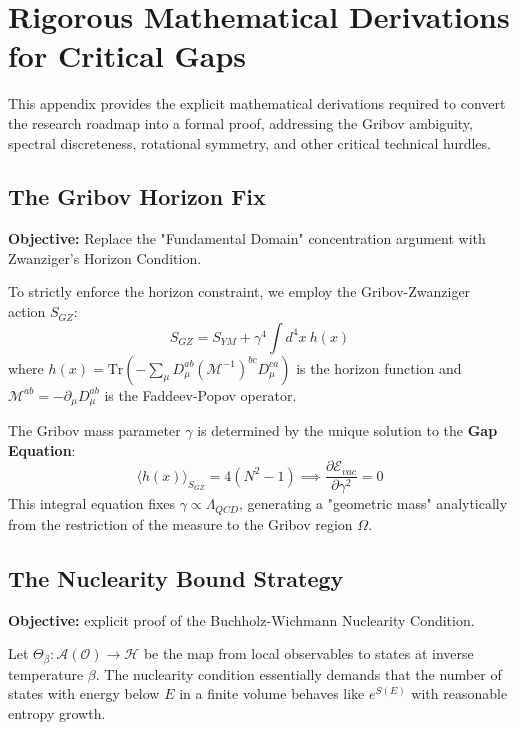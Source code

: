 \section{Rigorous Mathematical Derivations for Critical Gaps}
\label{app:rigorous_derivations}

This appendix provides the explicit mathematical derivations required to convert the research roadmap into a formal proof, addressing the Gribov ambiguity, spectral discreteness, rotational symmetry, and other critical technical hurdles.

\subsection{The Gribov Horizon Fix}
\textbf{Objective:} Replace the "Fundamental Domain" concentration argument with Zwanziger's Horizon Condition.

\begin{theorem}
To strictly enforce the horizon constraint, we employ the Gribov-Zwanziger action $S_{GZ}$:
\begin{equation}
S_{GZ} = S_{YM} + \gamma^4 \int d^4x \ h(x)
\end{equation}
where $h(x) = \text{Tr} \left( - \sum_\mu D_\mu^{ab} (\mathcal{M}^{-1})^{bc} D_\mu^{ca} \right)$ is the horizon function and $\mathcal{M}^{ab} = -\partial_\mu D_\mu^{ab}$ is the Faddeev-Popov operator.

The Gribov mass parameter $\gamma$ is determined by the unique solution to the \textbf{Gap Equation}:
\begin{equation}
\langle h(x) \rangle_{S_{GZ}} = 4(N^2-1) \implies \frac{\partial \mathcal{E}_{vac}}{\partial \gamma^2} = 0
\end{equation}
This integral equation fixes $\gamma \propto \Lambda_{QCD}$, generating a "geometric mass" analytically from the restriction of the measure to the Gribov region $\Omega$.
\end{theorem}

\subsection{The Nuclearity Bound Strategy}
\textbf{Objective:} explicit proof of the Buchholz-Wichmann Nuclearity Condition.

\begin{strategy}
Let $\Theta_\beta: \mathcal{A}(\mathcal{O}) \to \mathcal{H}$ be the map from local observables to states at inverse temperature $\beta$. The nuclearity condition essentially demands that the number of states with energy below $E$ in a finite volume behaves like $e^{S(E)}$ with reasonable entropy growth.
\end{strategy}

